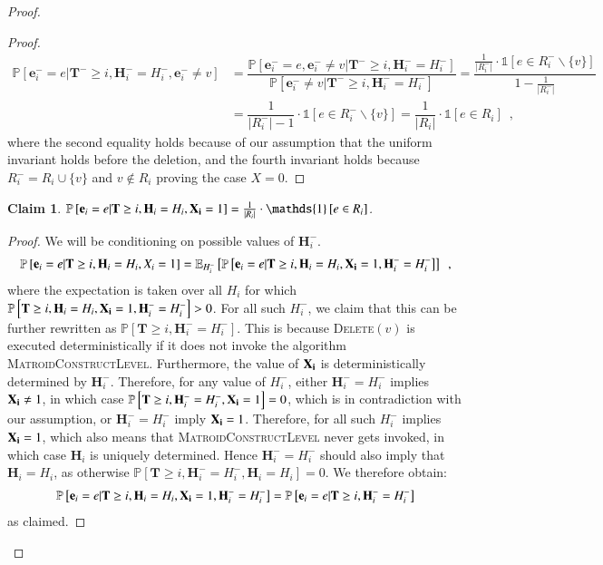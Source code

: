 \documentclass[11pt]{article}
\newtheorem{claim}{Claim}[section]
\renewcommand{\Pr}[1]{\ensuremath{\mathbb{P}\left[#1\right]}}
\newcommand{\Exu}[2]{\ensuremath{\mathbb{E}_{#1}\left[#2\right]}}
\newcommand{\ind}[1]{\ensuremath{\mathds{1}\left[#1\right]}}
\newcommand{\MatroidConstLevel}{\textsc{MatroidConstructLevel}}
\newcommand{\deletev}{{\textsc{Delete}}}
\newcommand{\bE}{\ensuremath{\mathbf{e}}}
\newcommand{\bT}{\ensuremath{\mathbf{T}}}
\newcommand{\bH}{\ensuremath{\mathbf{H}}}
\begin{document}
\begin{proof}
\begin{proof}
\begin{align*}
\Pr{\bE_i^- = e | \bT^- \geq i, \bH_i^- = H_i^-, \bE_i^- \neq v} 
&= \dfrac {\Pr{\bE_i^- = e, \bE_i^- \neq v| \bT^- \geq i, \bH_i^- = H_i^-}}
    {\Pr{\bE_i^- \neq v| \bT^- \geq i, \bH_i^- = H_i^-}} 
= \dfrac{\frac{1}{|R_i^{-}|} \cdot \ind{e \in R_i^{-} \backslash \{v\}}}{1 - \frac{1}{|R_i^{-}|}} \\
&= \dfrac{1}{|R_i^{-}| - 1} \cdot \ind{e \in R_i^{-} \backslash \{v\}} 
= \dfrac{1}{|R_i|} \cdot \ind{e \in R_i} \enspace ,
\end{align*}
where the second equality holds because of our assumption that the uniform invariant holds before the deletion, and the fourth invariant holds because $R_i^- = R_i \cup \{v\}$ and $v \notin R_i$ proving the case $X=0$.

\end{proof}



\begin{claim}
\label{propos:mat:delete2}
$\Pr{\bE_i = e | \bT \geq i, \bH_i = H_i, \bold{X_i} = 1} = \frac{1}{|R_i|} \cdot \ind{e \in R_i}$.
\end{claim}

\begin{proof}
We will be conditioning on possible values of $\bH_i^-$.  
\begin{align*}
    \Pr{\bE_i = e | \bT \geq i, \bH_i = H_i, X_i = 1} = \Exu{H_i^-}{\Pr{\bE_i = e | \bT \geq i, \bH_i = H_i, \bold{X_i} = 1, \bH_i^- = H_i^-}} \enspace ,
\end{align*}
where the expectation is taken over all $H_i$ for which $\Pr{\bT \geq i, \bH_i = H_i, \bold{X_i} = 1, \bH_i^- = H_i^-} > 0$.
For all such $H_i^-$, we claim that
this can be further rewritten as
$\Pr{\bT \geq i, \bH_i^- = H_i^-}$.
This is because \deletev$(v)$ is executed deterministically if it does not invoke 
the algorithm \MatroidConstLevel{}. Furthermore, the value of $\bold{X_i}$ is
deterministically determined by $\bH_i^-$.
Therefore, for any value of $H_i^-$, either
$\bH_i^-=H_i^-$ implies $\bold{X_i}\ne 1$, in which case $\Pr{\bT \geq i, \bH_i^- = H_i^-, \bold{X_i} = 1} = 0$, which is in contradiction with our assumption, or 
$\bH_i^- = H_i^-$ imply
$\bold{X_i}=1$. Therefore, for all such $H_i^-$ implies $\bold{X_i}=1$, which also means that \MatroidConstLevel{} never gets invoked, in which case $\bH_i$ is uniquely determined. Hence $\bH_i^- = H_i^-$ should also imply that $\bH_i = H_i$, as otherwise $\Pr{\bT \geq i, \bH_i^- = H_i^-, \bH_i = H_i} = 0$.
We therefore obtain: 
\begin{align*}
    \Pr{\bE_i = e | \bT \geq i, \bH_i = H_i, \bold{X_i} = 1, \bH_i^- = H_i^-} = \Pr{\bE_i = e | \bT \geq i, \bH_i^- = H_i^-} 
\end{align*}
as claimed.


\end{proof}
\end{proof}
\end{document}
